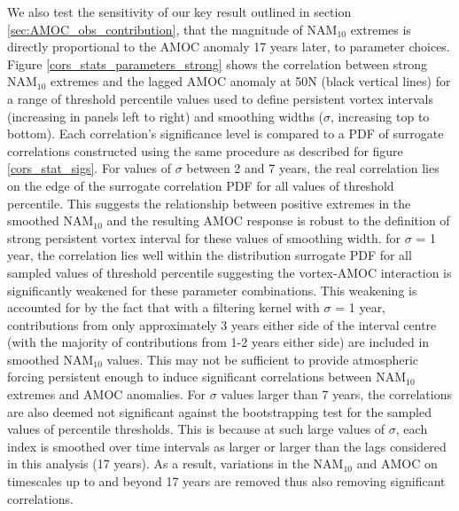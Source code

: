 We also test the sensitivity of our key result outlined in section \ref{sec:AMOC_obs_contribution}, that the magnitude of NAM$_{10}$ extremes is directly proportional to the AMOC anomaly 17 years later, to parameter choices. Figure \ref{cors_stats_parameters_strong} shows the correlation between strong NAM$_{10}$ extremes and the lagged AMOC anomaly at 50N (black vertical lines) for a range of threshold percentile values used to define persistent vortex intervals (increasing in panels left to right) and smoothing widths ($\sigma$, increasing top to bottom). Each correlation's significance level is compared to a PDF of surrogate correlations constructed using the same procedure as described for figure \ref{cors_stat_sigs}. For values of $\sigma$ between 2 and 7 years, the real correlation lies on the edge of the surrogate correlation PDF for all values of threshold percentile. This suggests the relationship between positive extremes in the smoothed NAM$_{10}$ and the resulting AMOC response is robust to the definition of strong persistent vortex interval for these values of smoothing width. for $\sigma$ = 1 year, the correlation lies well within the distribution surrogate PDF for all sampled values of threshold percentile suggesting the vortex-AMOC interaction is significantly weakened for these parameter combinations. This weakening is accounted for by the fact that with a filtering kernel with $\sigma$ = 1 year, contributions from only approximately 3 years either side of the interval centre (with the majority of contributions from 1-2 years either side) are included in smoothed NAM$_{10}$ values. This may not be sufficient to provide atmospheric forcing persistent enough to induce significant correlations between NAM$_{10}$ extremes and AMOC anomalies. For $\sigma$ values larger than 7 years, the correlations are also deemed not significant against the bootstrapping test for the sampled values of percentile thresholds. This is because at such large values of $\sigma$, each index is smoothed over time intervals as larger or larger than the lags considered in this analysis (17 years). As a result, variations in the NAM$_{10}$ and AMOC on timescales up to and beyond 17 years are removed thus also removing significant correlations.

\newpage

